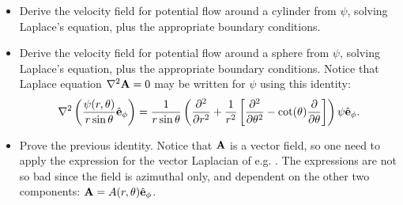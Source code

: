 \begin{itemize}
\item \label{ex:u_from_psi_cylinder} Derive the velocity field for
  potential flow around a cylinder from $\psi$, solving Laplace's
  equation, plus the appropriate boundary conditions.

  
\item \label{ex:u_from_psi_sphere} Derive the velocity field for
  potential flow around a sphere from $\psi$, solving Laplace's
  equation, plus the appropriate boundary conditions. Notice that
  Laplace equation $\nabla^2 \mathbf{A} = 0$ may be written for $\psi$ using
  this identity:
  \begin{equation}
    \label{eq:psi_eq_from_A}
    \nabla^2 \left(  \frac{\psi(r,\theta)}{r \sin\theta } \hat{\mathbf{e}}_\phi \right) =
    \frac{1}{r \sin\theta } 
    \left(
      \frac{\partial^2  }{\partial r^2} +
      \frac{1}{r^2} \left[
        \frac{\partial^2 }{\partial \theta^2} - 
        \cot(\theta) \frac{\partial }{\partial \theta}
      \right]
    \right) \psi \hat{\mathbf{e}}_\phi .
  \end{equation}

\item Prove the previous identity. Notice that $\mathbf{A}$ is a vector
  field, so one need to apply the expression for the vector Laplacian
  of e.g. \cite{wiki:del}. The expressions are not so bad since the
  field is azimuthal only, and dependent on the other two components:
  $ \mathbf{A} = A(r,\theta) \hat{\mathbf{e}}_\phi$.






\end{itemize}



